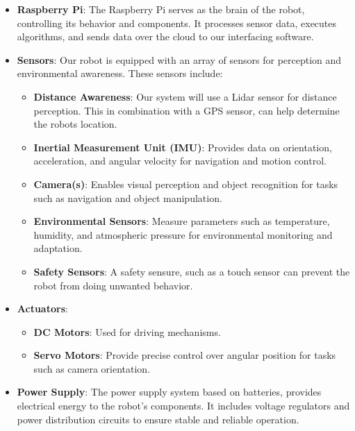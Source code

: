 \documentclass[a4paper]{article}
\begin{document}
\begin{itemize}
    \item \textbf{Raspberry Pi}: The Raspberry Pi serves as the brain of the robot, controlling its behavior and components. It processes sensor data, executes algorithms, and sends data over the cloud to our interfacing software.
    
    \item \textbf{Sensors}: Our robot is equipped with an array of sensors for perception and environmental awareness. These sensors include:
    \begin{itemize}
        \item \textbf{Distance Awareness}: Our system will use a Lidar sensor for distance perception. This in combination with a GPS sensor, can help determine the robots location.
        \item \textbf{Inertial Measurement Unit (IMU)}: Provides data on orientation, acceleration, and angular velocity for navigation and motion control.
        \item \textbf{Camera(s)}: Enables visual perception and object recognition for tasks such as navigation and object manipulation.
        \item \textbf{Environmental Sensors}: Measure parameters such as temperature, humidity, and atmospheric pressure for environmental monitoring and adaptation.
        \item \textbf{Safety Sensors}: A safety sensure, such as a touch sensor can prevent the robot from doing unwanted behavior. 
    \end{itemize}
    
    \item \textbf{Actuators}: 
    \begin{itemize}
        \item \textbf{DC Motors}: Used for driving mechanisms.
        \item \textbf{Servo Motors}: Provide precise control over angular position for tasks such as camera orientation.
    \end{itemize}
    
    \item \textbf{Power Supply}: The power supply system based on batteries, provides electrical energy to the robot's components. It includes voltage regulators and power distribution circuits to ensure stable and reliable operation.
    
\end{itemize}
\end{document}
